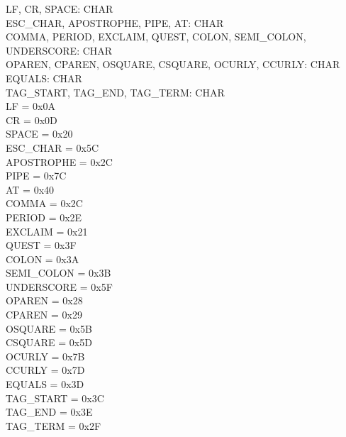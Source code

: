 \documentclass[letterpaper,10pt,draft]{article}
\begin{document}
\begin{axdef}
   LF, CR, SPACE: CHAR \\
   ESC\_CHAR, APOSTROPHE, PIPE, AT: CHAR \\
   COMMA, PERIOD, EXCLAIM, QUEST, COLON, SEMI\_COLON, UNDERSCORE: CHAR \\
   OPAREN, CPAREN, OSQUARE, CSQUARE, OCURLY, CCURLY: CHAR \\
   EQUALS: CHAR \\
   TAG\_START, TAG\_END, TAG\_TERM: CHAR \\
\where
   LF = 0x0A \\
   CR = 0x0D \\
   SPACE = 0x20 \\
   ESC\_CHAR = 0x5C \\
   APOSTROPHE = 0x2C \\
   PIPE = 0x7C \\
   AT = 0x40 \\
   COMMA = 0x2C \\
   PERIOD = 0x2E \\
   EXCLAIM = 0x21 \\
   QUEST = 0x3F \\
   COLON = 0x3A \\
   SEMI\_COLON = 0x3B \\
   UNDERSCORE = 0x5F \\
   OPAREN = 0x28 \\
   CPAREN = 0x29 \\
   OSQUARE = 0x5B \\
   CSQUARE = 0x5D \\
   OCURLY = 0x7B \\
   CCURLY = 0x7D \\
   EQUALS = 0x3D \\
   TAG\_START = 0x3C \\
   TAG\_END = 0x3E \\
   TAG\_TERM = 0x2F \\
\end{axdef}

\begin{zed}
    \\
    \\
    \\
    \\
    \\
    \\
    \\
    \\
    \\
\end{zed}
\end{document}
